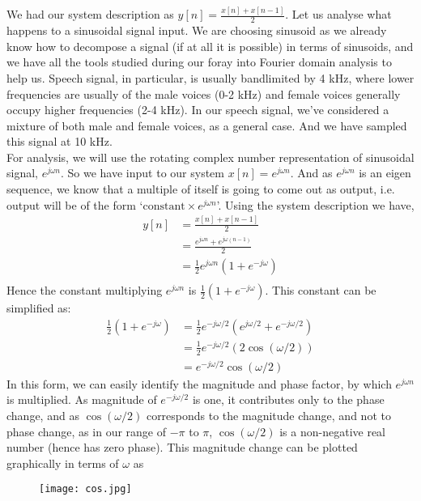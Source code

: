We had our system description as $y[n]=\frac{x[n]+x[n-1]}{2}$. Let us analyse what happens to a sinusoidal signal input. We are choosing sinusoid as we already know how to decompose a signal (if at all it is possible) in terms of sinusoids, and we have all the tools studied during our foray into Fourier domain analysis to help us. Speech signal, in particular, is usually bandlimited by 4 kHz, where lower frequencies are usually of the male voices (0-2 kHz) and female voices generally occupy higher frequencies (2-4 kHz). In our speech signal, we've considered a mixture of both male and female voices, as a general case. And we have sampled this signal at 10 kHz.\\
For analysis, we will use the rotating complex number representation of sinusoidal signal, $e^{j\omega n}$. So we have input to our system $x[n]=e^{j\omega n}$. And as $e^{j\omega n}$ is an eigen sequence, we know that a multiple of itself is going to come out as output, i.e. output will be of the form `$\text{constant}\times e^{j\omega n}$'. Using the system description we have,
\begin{align*}
y[n]&=\frac{x[n]+x[n-1]}{2}\\
&=\frac{e^{j\omega n}+e^{j\omega (n-1)}}{2}\\
&=\frac{1}{2}e^{j\omega n}\left(1+e^{-j\omega}\right)\\
\end{align*}
Hence the constant multiplying $e^{j\omega n}$ is $\frac{1}{2}\left(1+e^{-j\omega}\right)$. This constant can be simplified as:
\begin{align*}
\frac{1}{2}\left(1+e^{-j\omega}\right)&=\frac{1}{2}e^{-j\omega/2}(e^{j\omega/2}+e^{-j\omega/2})\\
&=\frac{1}{2}e^{-j\omega/2}(2\cos(\omega/2))\\
&=e^{-j\omega/2}\cos(\omega/2)
\end{align*}
In this form, we can easily identify the magnitude and phase factor, by which $e^{j\omega n}$ is multiplied. As magnitude of $e^{-j\omega/2}$ is one, it contributes only to the phase change, and as $\cos(\omega/2)$ corresponds to the magnitude change, and not to phase change, as in our range of $-\pi$ to $\pi$, $\cos(\omega/2)$ is a non-negative real number (hence has zero phase). This magnitude change can be plotted graphically in terms of $\omega$ as\\

\begin{figure}[htb]
\centering
\texttt{[image: cos.jpg]}
\caption{\label{fig:fig6}}
\end{figure}

